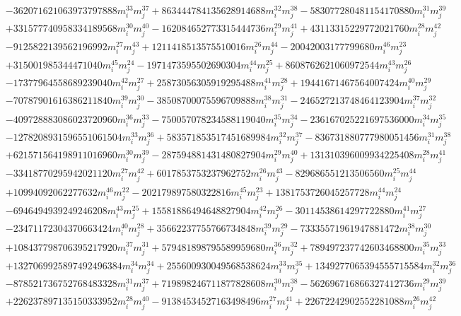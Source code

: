 {\begin{align*}
&-362071621063973797888m_i^{33}m_j^{37}+863444784135628914688m_i^{32}m_j^{38}-583077280481154170880m_i^{31}m_j^{39}\\
&+331577740958334189568m_i^{30}m_j^{40}-162084652773315444736m_i^{29}m_j^{41}+43113315229772021760m_i^{28}m_j^{42}\\
&-9125822139562196992m_i^{27}m_j^{43}+1211418513575510016m_i^{26}m_j^{44}-20042003177799680m_i^{46}m_j^{23}\\
&+315001985344471040m_i^{45}m_j^{24}-1971473595502690304m_i^{44}m_j^{25}+8608762621060972544m_i^{43}m_j^{26}\\
&-17377964558689239040m_i^{42}m_j^{27}+25873056305919295488m_i^{41}m_j^{28}+19441671467564007424m_i^{40}m_j^{29}\\
&-70787901616386211840m_i^{39}m_j^{30}-38508700075596709888m_i^{38}m_j^{31}-246527213748464123904m_i^{37}m_j^{32}\\
&-409728883086023720960m_i^{36}m_j^{33}-750057078234588119040m_i^{35}m_j^{34}-236167025221697536000m_i^{34}m_j^{35}\\
&-1278208931596551061504m_i^{33}m_j^{36}+583571853517451689984m_i^{32}m_j^{37}-836731880777980051456m_i^{31}m_j^{38}\\
&+621571564198911016960m_i^{30}m_j^{39}-287594881431480827904m_i^{29}m_j^{40}+131310396009934225408m_i^{28}m_j^{41}\\
&-33418770295942021120m_i^{27}m_j^{42}+6017853753237962752m_i^{26}m_j^{43}-829686551213506560m_i^{25}m_j^{44}\\
&+10994092062277632m_i^{46}m_j^{22}-202179897580322816m_i^{45}m_j^{23}+1381753726045257728m_i^{44}m_j^{24}\\
&-6946494939249246208m_i^{43}m_j^{25}+15581886494648827904m_i^{42}m_j^{26}-30114538614297722880m_i^{41}m_j^{27}\\
&-23471172304370663424m_i^{40}m_j^{28}+35662237755766734848m_i^{39}m_j^{29}-73335571961947881472m_i^{38}m_j^{30}\\
&+108437798706395217920m_i^{37}m_j^{31}+579481898795589959680m_i^{36}m_j^{32}+789497237742603468800m_i^{35}m_j^{33}\\
&+1327069925897492496384m_i^{34}m_j^{34}+255600930049568538624m_i^{33}m_j^{35}+1349277065394555715584m_i^{32}m_j^{36}\\
&-878521736752768483328m_i^{31}m_j^{37}+719898246711877828608m_i^{30}m_j^{38}-562696716866327412736m_i^{29}m_j^{39}\\
&+226237897135150333952m_i^{28}m_j^{40}-91384534527163498496m_i^{27}m_j^{41}+22672242902552281088m_i^{26}m_j^{42}\\

\end{align*}}
